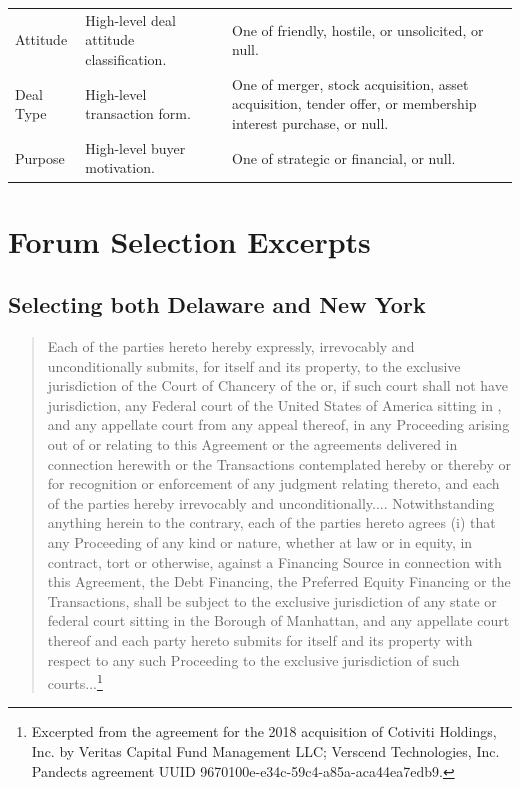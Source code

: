 \documentclass[12pt]{article}
\begin{document}
{\begin{appendices}
\begin{center}
\begin{longtable}{p{}p{}p{}}
Attitude & High-level deal attitude classification. & One of friendly, hostile, or unsolicited, or null. \\
Deal Type & High-level transaction form. & One of merger, stock acquisition, asset acquisition, tender offer, or membership interest purchase, or null. \\
Purpose & High-level buyer motivation. & One of strategic or financial, or null. \\
\end{longtable}
\end{center}
\endgroup
\normalsize

\section{Forum Selection Excerpts}
\label{app:clause-excerpts}
\subsection{Selecting both Delaware and New York}
\label{app:excerpt-de-ny}
\begingroup
\singlespacing
\begin{quote}
  Each of the parties hereto hereby expressly, irrevocably and unconditionally submits, for itself and its property, to the exclusive jurisdiction of the Court of Chancery of the  or, if such court shall not have jurisdiction, any Federal court of the United States of America sitting in , and any appellate court from any appeal thereof, in any Proceeding arising out of or relating to this Agreement or the agreements delivered in connection herewith or the Transactions contemplated hereby or thereby or for recognition or enforcement of any judgment relating thereto, and each of the parties hereby irrevocably and unconditionally.... Notwithstanding anything herein to the contrary, each of the parties hereto agrees (i) that any Proceeding of any kind or nature, whether at law or in equity, in contract, tort or otherwise, against a Financing Source in connection with this Agreement, the Debt Financing, the Preferred Equity Financing or the Transactions, shall be subject to the exclusive jurisdiction of any state or federal court sitting in the Borough of Manhattan,  and any appellate court thereof and each party hereto submits for itself and its property with respect to any such Proceeding to the exclusive jurisdiction of such courts...\footnote{Excerpted from the agreement for the 2018 acquisition of Cotiviti Holdings, Inc. by Veritas Capital Fund Management LLC; Verscend Technologies, Inc. Pandects agreement UUID 9670100e-e34c-59c4-a85a-aca44ea7edb9.}
\end{quote}
\endgroup


\end{appendices}}
\end{document}
